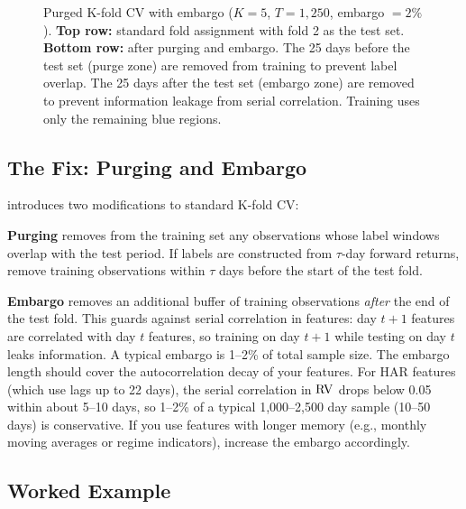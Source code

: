 \begin{figure}[ht]
\begin{tikzpicture}
\end{tikzpicture}
\caption{Purged K-fold CV with embargo ($K=5$, $T=1{,}250$, embargo $= 2\%$).
\textbf{Top row:} standard fold assignment with fold 2 as the test set.
\textbf{Bottom row:} after purging and embargo.
The 25 days before the test set (\textcolor{warnred}{purge zone}) are removed from training to prevent label overlap.
The 25 days after the test set (\textcolor{prereqpurple}{embargo zone}) are removed to prevent information leakage from serial correlation.
Training uses only the remaining blue regions.}
\label{fig:purged-cv}
\end{figure}

\subsection{The Fix: Purging and Embargo}

\citet{LopezdePrado2018} introduces two modifications to standard K-fold CV:

\begin{definition}[Purging]
\textbf{Purging} removes from the training set any observations whose label windows overlap with the test period.
If labels are constructed from $\tau$-day forward returns, remove training observations within $\tau$ days before the start of the test fold.
\end{definition}

\begin{definition}[Embargo]
\textbf{Embargo} removes an additional buffer of training observations \emph{after} the end of the test fold.
This guards against serial correlation in features: day $t+1$ features are correlated with day $t$ features, so training on day $t+1$ while testing on day $t$ leaks information.
A typical embargo is 1--2\% of total sample size.
The embargo length should cover the autocorrelation decay of your features.
For HAR features (which use lags up to 22 days), the serial correlation in $\operatorname{RV}$ drops below 0.05 within about 5--10 days, so 1--2\% of a typical 1,000--2,500 day sample (10--50 days) is conservative.
If you use features with longer memory (e.g., monthly moving averages or regime indicators), increase the embargo accordingly.
\end{definition}

\subsection{Worked Example}

